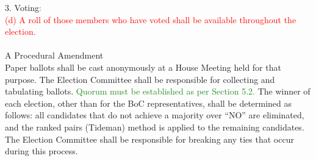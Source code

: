 \documentclass[10pt]{article} %
\newcommand{\add}[1]{\textcolor{ForestGreen}{#1}} %
\newcommand{\del}[1]{\textcolor{red}{#1}} %
\begin{document}
\begin{itemize}
        3. Voting\add{:} \\
        \del{(d) A roll of those members who have voted shall be available throughout the election.} \\ \\
        A Procedural Amendment \\
        Paper ballots shall be cast anonymously at a House Meeting held for that purpose. The Election Committee shall be responsible for collecting and tabulating ballots. \add{Quorum must be established as per Section 5.2.} The winner of each election, other than for the BoC representatives, shall be determined as follows: all candidates that do not achieve a majority over “NO” are eliminated, and the ranked pairs (Tideman) method is applied to the remaining candidates. The Election Committee shall be responsible for breaking any ties that occur during this process.
\end{itemize}
\end{document}
